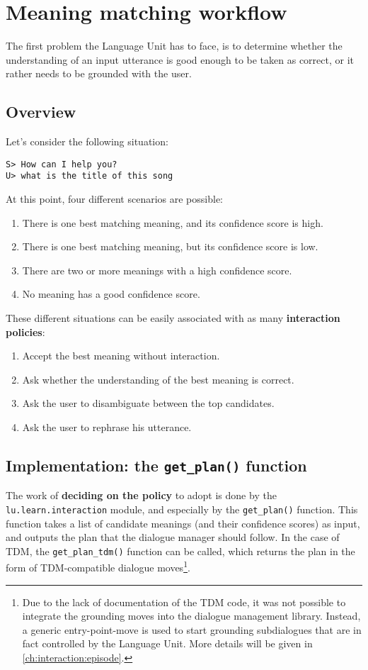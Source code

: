 \section{Meaning matching workflow} \label{ch:interaction:mmw}
The first problem the Language Unit has to face, is to determine whether the understanding of an input utterance is good enough to be taken as correct, or it rather needs to be grounded with the user.

\subsection{Overview}
Let's consider the following situation:

\texttt{S> How can I help you? \\
U> what is the title of this song}

At this point, four different scenarios are possible:
\begin{enumerate}
	\item There is one best matching meaning, and its confidence score is high.
	\item There is one best matching meaning, but its confidence score is low.
	\item There are two or more meanings with a high confidence score.
	\item No meaning has a good confidence score.
\end{enumerate}
These different situations can be easily associated with as many \textbf{interaction policies}:
\begin{enumerate}
	\item Accept the best meaning without interaction.
	\item Ask whether the understanding of the best meaning is correct.
	\item Ask the user to disambiguate between the top candidates.
	\item Ask the user to rephrase his utterance.
\end{enumerate}

\subsection{Implementation: the \texttt{get\_plan()} function} \label{ch:interaction:mmw:getplan}
The work of \textbf{deciding on the policy} to adopt is done by the \texttt{lu.learn.interaction} module, and especially by the \texttt{get\_plan()} function. This function takes a list of candidate meanings (and their confidence scores) as input, and outputs the plan that the dialogue manager should follow. In the case of TDM, the \texttt{get\_plan\_tdm()} function can be called, which returns the plan in the form of TDM-compatible dialogue moves\footnote{Due to the lack of documentation of the TDM code, it was not possible to integrate the grounding moves into the dialogue management library. Instead, a generic entry-point-move is used to start grounding subdialogues that are in fact controlled by the Language Unit. More details will be given in \ref{ch:interaction:episode}.}.

